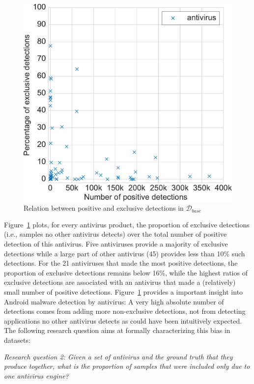 \begin{figure}[!ht]
	\centering
	\includegraphics[width=0.75\linewidth]{figures/stase/exclusivity.pdf}
        \caption[Relation between positive and exclusive detections]{Relation between positive and exclusive detections in $\mathcal{D}_{base} $}
	\label{figure:stase:exclusivity}
\end{figure}

Figure~\ref{figure:stase:exclusivity} plots, for every antivirus product, the proportion of exclusive detections (i.e., samples no other antivirus detects) over the total number of positive detection of this antivirus.
Five antiviruses provide a majority of exclusive detections while a large part of other antivirus (45) provides less than 10\% such detections.
For the 21 antiviruses that made the most positive detections, the proportion of exclusive detections remains below 16\%, while the highest ratios of exclusive detections are associated with an antivirus that made a (relatively) small number of positive detections.
Figure~\ref{figure:stase:exclusivity} provides a important insight into Android malware detection by antivirus: A very high absolute number of detections comes from adding more non-exclusive detections, not from detecting applications no other antivirus detects as could have been intuitively expected.
The following research question aims at formally characterizing this bias in datasets:

\begin{mdframed}[roundcorner=10pt,nobreak=true]
	{\em Research question 2: Given a set of antivirus and the ground truth that they produce together, what is the proportion of samples that were included only due to one antivirus engine?}
\end{mdframed}

